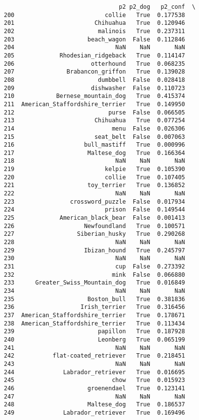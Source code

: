 \documentclass[11pt]{article}
\begin{document}
\begin{verbatim}
                                 p2 p2_dog   p2_conf  \
200                          collie   True  0.177538   
201                       Chihuahua   True  0.120946   
202                        malinois   True  0.237311   
203                     beach_wagon  False  0.112846   
204                             NaN    NaN       NaN   
205             Rhodesian_ridgeback   True  0.114147   
206                      otterhound   True  0.068235   
207               Brabancon_griffon   True  0.139028   
208                        dumbbell  False  0.028418   
209                      dishwasher  False  0.110723   
210            Bernese_mountain_dog   True  0.415374   
211  American_Staffordshire_terrier   True  0.149950   
212                           purse  False  0.066505   
213                       Chihuahua   True  0.077254   
214                            menu  False  0.026306   
215                       seat_belt  False  0.007063   
216                    bull_mastiff   True  0.000996   
217                     Maltese_dog   True  0.166364   
218                             NaN    NaN       NaN   
219                          kelpie   True  0.105390   
220                          collie   True  0.107405   
221                     toy_terrier   True  0.136852   
222                             NaN    NaN       NaN   
223                crossword_puzzle  False  0.017934   
224                          prison  False  0.149544   
225             American_black_bear  False  0.001413   
226                    Newfoundland   True  0.100571   
227                  Siberian_husky   True  0.290268   
228                             NaN    NaN       NaN   
229                    Ibizan_hound   True  0.245797   
230                             NaN    NaN       NaN   
231                             cup  False  0.273392   
232                            mink  False  0.066880   
233      Greater_Swiss_Mountain_dog   True  0.016849   
234                             NaN    NaN       NaN   
235                     Boston_bull   True  0.381836   
236                   Irish_terrier   True  0.316456   
237  American_Staffordshire_terrier   True  0.178671   
238  American_Staffordshire_terrier   True  0.113434   
239                        papillon   True  0.187928   
240                        Leonberg   True  0.065199   
241                             NaN    NaN       NaN   
242           flat-coated_retriever   True  0.218451   
243                             NaN    NaN       NaN   
244              Labrador_retriever   True  0.016695   
245                            chow   True  0.015923   
246                     groenendael   True  0.123141   
247                             NaN    NaN       NaN   
248                     Maltese_dog   True  0.186537   
249              Labrador_retriever   True  0.169496   


\end{verbatim}
\end{document}
